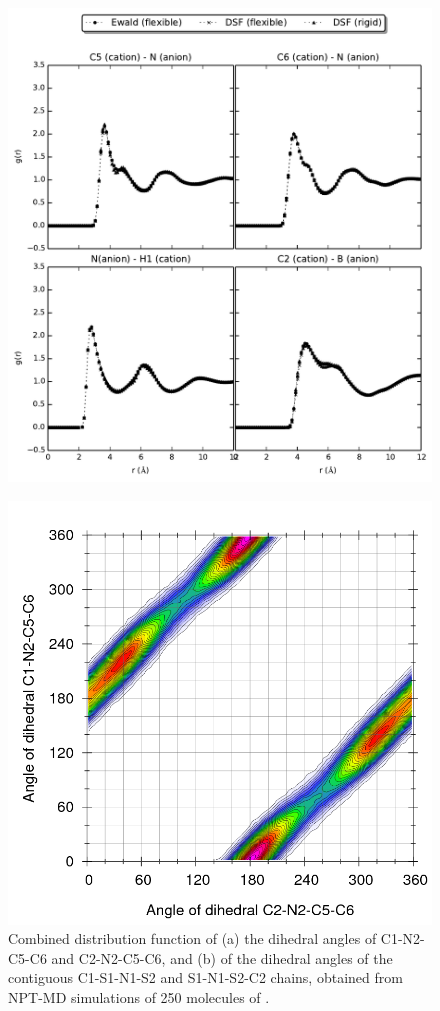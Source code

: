 \documentclass[3p,onecolumn]{elsarticle}
\begin{document}
\begin{figure}[ht]
\includegraphics[]{rdf-Weber}
\caption{\ce{[emim][B(CN)_4]}}
\label{fig:rdf-Weber}
\end{figure}

\begin{figure}
	\centering
	\includegraphics[width=\linewidth]{Ludwig}%
	
	\caption{Combined distribution function of (a) the dihedral angles of C1-N2-C5-C6 and C2-N2-C5-C6, and (b) of the dihedral angles of the contiguous  C1-S1-N1-S2 and S1-N1-S2-C2 chains, obtained from NPT-MD simulations of 250 molecules of \ce{[emim][NTf_2]}.}
	\label{fig:die_ntf2}
\end{figure}
\end{document}
